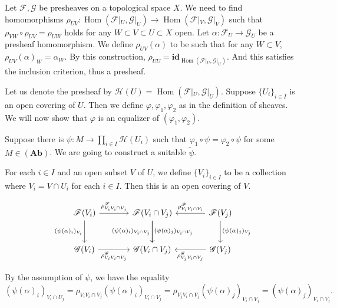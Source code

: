 \documentclass{article}
\DeclareMathOperator{\Hom}{Hom}
\begin{document}
\par Let $\mathcal{F},\mathcal{G}$ be presheaves on a topological space $X$. We need to find homomorphisms $\rho_{UV}:\Hom(\mathcal{F}|_U,\mathcal{G}|_U)\to\Hom(\mathcal{F}|_V,\mathcal{G}|_V)$ such that $\rho_{VW}\circ\rho_{UV}=\rho_{UW}$ holds
for any $W\subset V\subset U\subset X$ open. Let $\alpha:\mathcal{F}_U\to\mathcal{G}_U$ be a presheaf homomorphism. We define $\rho_{UV}(\alpha)$ to be such that for any $W\subset V$, $\rho_{UV}(\alpha)_W = \alpha_W$. By this construction, $\rho_{UU}=\mathbf{id}_{\Hom(\mathcal{F}|_U,\mathcal{G}|_U)}$. And this satisfies the inclusion criterion, thus a presheaf. 
\\
\par Let us denote the presheaf by $\mathcal{H}(U) = \Hom(\mathcal{F}|_U,\mathcal{G}|_U)$. Suppose $\{U_i\}_{i\in I}$ is an open covering of $U$. Then we define $\varphi,\varphi_1,\varphi_2$ as in the definition of sheaves. We will now show that $\varphi$ is an equalizer of $(\varphi_1,\varphi_2)$. \\
\par Suppose there is $\psi:M\to\prod_{i\in I}\mathcal{H}(U_i)$ such that $\varphi_1\circ\psi = \varphi_2\circ\psi$ for some $M\in(\mathbf{Ab})$. We are going to construct a suitable $\tilde{\psi}$.\\

\par For each $i\in I$ and an open subset $V$ of $U$, we define $\{V_i\}_{i\in I}$ to be a collection where $V_i=V\cap U_i$ for each $i\in I$. Then this is an open covering of $V$. 

\[ \begin{tikzcd}[row sep=large, column sep=large]
\mathcal{F}(V_i) \arrow{r}{\rho^{\mathcal{F}}_{V_iV_i\cap V_j}} \arrow[swap]{d}{(\psi(\alpha)_i)_{V_i}} & \mathcal{F}(V_i\cap V_j) \arrow{d}[swap]{(\psi(\alpha)_i)_{V_i\cap V_j}} \arrow{d}{(\psi(\alpha)_j)_{V_i\cap V_j}}&\arrow{l}[swap]{\rho^{\mathcal{F}}_{V_iV_i\cap V_i}} \mathcal{F}(V_j)\arrow{d}{(\psi(\alpha)_j)_{V_j}}\\%
\mathcal{G}(V_i) \arrow{r}[swap]{\rho^{\mathcal{G}}_{V_iV_i\cap V_j}} & \mathcal{G}(V_i\cap V_j)&\arrow{l}{\rho^{\mathcal{G}}_{V_jV_i\cap V_j}} \mathcal{G}(V_j)
\end{tikzcd}
\]

By the assumption of $\psi$, we have the equality
\begin{equation*}
(\psi(\alpha)_i)_{V_i\cap U_j} = \rho_{V_iV_i\cap V_j}(\psi(\alpha)_i)_{V_i\cap V_j}=\rho_{V_jV_i\cap V_j}(\psi(\alpha)_j)_{V_i\cap V_j}=(\psi(\alpha)_j)_{V_i\cap V_j}.
\end{equation*}
\end{document}
